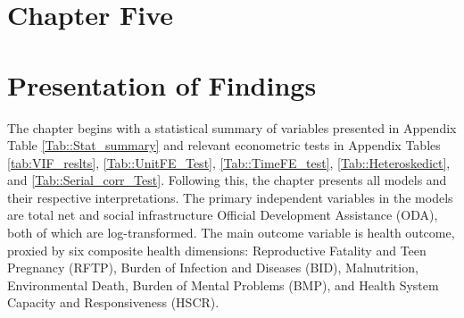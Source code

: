 \section*{\centering Chapter Five}
\section*{\centering Presentation of Findings}

The chapter begins with a statistical summary of variables presented in Appendix Table \ref{Tab::Stat_summary} and relevant econometric tests in Appendix Tables \ref{tab:VIF_reslts}, \ref{Tab::UnitFE_Test}, \ref{Tab::TimeFE_test}, \ref{Tab::Heteroskedict}, and \ref{Tab::Serial_corr_Test}. Following this, the chapter presents all models and their respective interpretations. The primary independent variables in the models are total net and social infrastructure Official Development Assistance (ODA), both of which are log-transformed. The main outcome variable is health outcome, proxied by six composite health dimensions: Reproductive Fatality and Teen Pregnancy (RFTP), Burden of Infection and Diseases (BID), Malnutrition, Environmental Death, Burden of Mental Problems (BMP), and Health System Capacity and Responsiveness (HSCR). 

